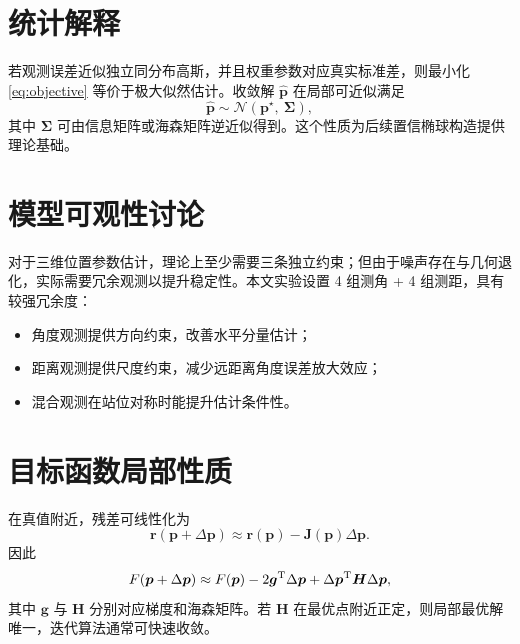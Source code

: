 \section{统计解释}
若观测误差近似独立同分布高斯，并且权重参数对应真实标准差，则最小化 \eqref{eq:objective} 等价于极大似然估计。收敛解 $\hat{\bm p}$ 在局部可近似满足
\[
\hat{\bm p}\sim \mathcal N\left(\bm p^\star,\ \bm\Sigma\right),
\]
其中 $\bm\Sigma$ 可由信息矩阵或海森矩阵逆近似得到。这个性质为后续置信椭球构造提供理论基础。

\section{模型可观性讨论}
对于三维位置参数估计，理论上至少需要三条独立约束；但由于噪声存在与几何退化，实际需要冗余观测以提升稳定性。本文实验设置 4 组测角 + 4 组测距，具有较强冗余度：
\begin{itemize}
  \item 角度观测提供方向约束，改善水平分量估计；
  \item 距离观测提供尺度约束，减少远距离角度误差放大效应；
  \item 混合观测在站位对称时能提升估计条件性。
\end{itemize}

\section{目标函数局部性质}
在真值附近，残差可线性化为
\[
\bm r(\bm p+\Delta\bm p)\approx \bm r(\bm p)-\bm J(\bm p)\Delta\bm p.
\]
因此
\[
F(\bm p+\Delta\bm p)\approx
F(\bm p)-2\bm g^{\mathrm{T}}\Delta\bm p+\Delta\bm p^{\mathrm{T}}\bm H\Delta\bm p,
\]
其中 $\bm g$ 与 $\bm H$ 分别对应梯度和海森矩阵。若 $\bm H$ 在最优点附近正定，则局部最优解唯一，迭代算法通常可快速收敛。
